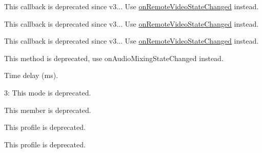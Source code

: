 \begin{DoxyRefList}
This callback is deprecated since v3... Use \mbox{\hyperlink{classagora_1_1rtc_1_1_i_rtc_engine_event_handler_ae69799238c6a6cd9f017274dd630b74e}{on\+Remote\+Video\+State\+Changed}} instead. 
\item[Member \mbox{\hyperlink{classagora_1_1rtc_1_1_i_rtc_engine_event_handler_a42dc566926966cc7b922d10b81bfd48e}{agora\+::rtc\+::I\+Rtc\+Engine\+Event\+Handler\+::on\+User\+Mute\+Video}} (uid\+\_\+t user\+Id, bool muted) \+\_\+\+\_\+deprecated]\label{deprecated__deprecated000010}%
%
This callback is deprecated since v3... Use \mbox{\hyperlink{classagora_1_1rtc_1_1_i_rtc_engine_event_handler_ae69799238c6a6cd9f017274dd630b74e}{on\+Remote\+Video\+State\+Changed}} instead. 
\item[Member \mbox{\hyperlink{classagora_1_1rtc_1_1_i_rtc_engine_event_handler_ad8083c52d15135762a31c48192ad64f2}{agora\+::rtc\+::I\+Rtc\+Engine\+Event\+Handler\+::on\+First\+Remote\+Video\+Decoded}} (uid\+\_\+t uid, int width, int height, int elapsed) \+\_\+\+\_\+deprecated]\label{deprecated__deprecated000009}%
%
This callback is deprecated since v3... Use \mbox{\hyperlink{classagora_1_1rtc_1_1_i_rtc_engine_event_handler_ae69799238c6a6cd9f017274dd630b74e}{on\+Remote\+Video\+State\+Changed}} instead. 
\item[Member \mbox{\hyperlink{classagora_1_1rtc_1_1_i_rtc_engine_event_handler_a844b1585ecc0c86471d7dd5a462eaaf3}{agora\+::rtc\+::I\+Rtc\+Engine\+Event\+Handler\+::on\+Audio\+Mixing\+Finished}} () \+\_\+\+\_\+deprecated]\label{deprecated__deprecated000008}%
%
This method is deprecated, use on\+Audio\+Mixing\+State\+Changed instead. 
\item[Member \mbox{\hyperlink{structagora_1_1rtc_1_1_remote_video_stats_a0a0f8269be3dfe782aa5d0cf7dc074f0}{agora\+::rtc\+::Remote\+Video\+Stats\+::\+\_\+\+\_\+deprecated}} ]\label{deprecated__deprecated000007}%
%
Time delay (ms). 
\item[Member \mbox{\hyperlink{classagora_1_1rtc_1_1_i_media_player_source_a615d51990acbcb28e6753dca86e32edd}{agora\+::rtc\+::I\+Media\+Player\+Source\+::open\+With\+Custom\+Source}} (int64\+\_\+t start\+Pos, \mbox{\hyperlink{classagora_1_1media_1_1base_1_1_i_media_player_custom_data_provider}{media\+::base\+::\+I\+Media\+Player\+Custom\+Data\+Provider}} $\ast$provider)=0]\label{deprecated__deprecated000006}%
%
  
\item[" ]\label{deprecated__deprecated000005}%
%
 3\+: This mode is deprecated. 

\label{deprecated__deprecated000004}%
%
This member is deprecated. 

\label{deprecated__deprecated000003}%
%
This profile is deprecated. 

\label{deprecated__deprecated000002}%
%
This profile is deprecated. 
\end{DoxyRefList}